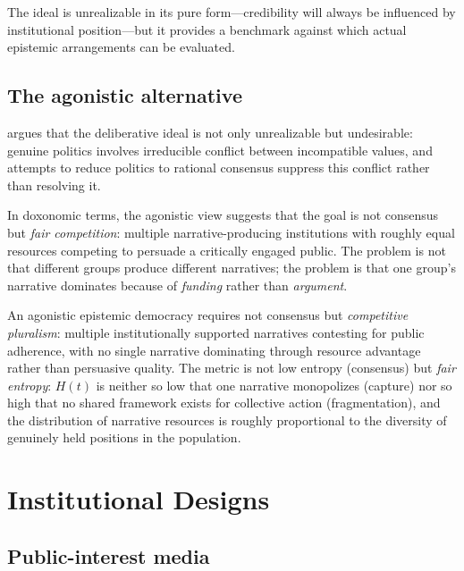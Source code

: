 The ideal is unrealizable in its pure form---credibility will always be influenced by institutional position---but it provides a benchmark against which actual epistemic arrangements can be evaluated.

\subsection{The agonistic alternative}

\textcite{mouffe2005} argues that the deliberative ideal is not only unrealizable but undesirable: genuine politics involves irreducible conflict between incompatible values, and attempts to reduce politics to rational consensus suppress this conflict rather than resolving it.

In doxonomic terms, the agonistic view suggests that the goal is not consensus but \emph{fair competition}: multiple narrative-producing institutions with roughly equal resources competing to persuade a critically engaged public.
The problem is not that different groups produce different narratives; the problem is that one group's narrative dominates because of \emph{funding} rather than \emph{argument}.

\begin{proposition}
\label{prop:agonistic}
An agonistic epistemic democracy requires not consensus but \emph{competitive pluralism}: multiple institutionally supported narratives contesting for public adherence, with no single narrative dominating through resource advantage rather than persuasive quality.
The metric is not low entropy (consensus) but \emph{fair entropy}: $H(t)$ is neither so low that one narrative monopolizes (capture) nor so high that no shared framework exists for collective action (fragmentation), and the distribution of narrative resources is roughly proportional to the diversity of genuinely held positions in the population.
\end{proposition}

\section{Institutional Designs}
\label{sec:ch32-designs}

\subsection{Public-interest media}

